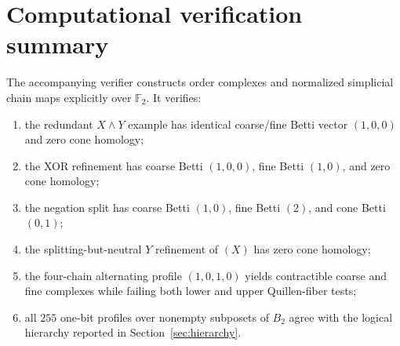 \documentclass[11pt]{article}
\theoremstyle{definition}
\newcommand{\F}{\mathbb F_2}
\begin{document}
\appendix
\section{Computational verification summary}

The accompanying verifier constructs order complexes and normalized simplicial chain maps explicitly over \(\F\). It verifies:
\begin{enumerate}[label=(\roman*)]
\item the redundant \(X\wedge Y\) example has identical coarse/fine Betti vector \((1,0,0)\) and zero cone homology;
\item the XOR refinement has coarse Betti \((1,0,0)\), fine Betti \((1,0)\), and zero cone homology;
\item the negation split has coarse Betti \((1,0)\), fine Betti \((2)\), and cone Betti \((0,1)\);
\item the splitting-but-neutral \(Y\) refinement of \((X)\) has zero cone homology;
\item the four-chain alternating profile \((1,0,1,0)\) yields contractible coarse and fine complexes while failing both lower and upper Quillen-fiber tests;
\item all \(255\) one-bit profiles over nonempty subposets of \(B_2\) agree with the logical hierarchy reported in Section~\ref{sec:hierarchy}.
\end{enumerate}
\end{document}
